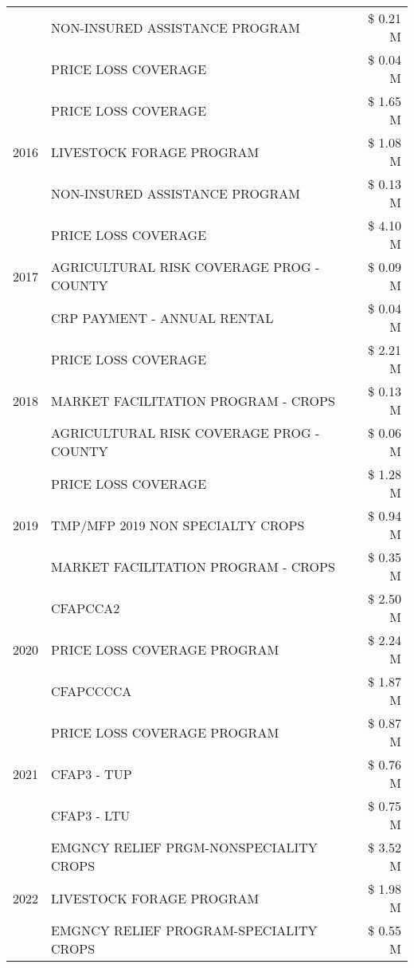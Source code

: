 \begin{tabular}{llr}
 & NON-INSURED ASSISTANCE PROGRAM & \$ 0.21 M \\
 & PRICE LOSS COVERAGE & \$ 0.04 M \\
\cline{1-3}
\multirow[t]{3}{*}{2016} & PRICE LOSS COVERAGE & \$ 1.65 M \\
 & LIVESTOCK FORAGE PROGRAM & \$ 1.08 M \\
 & NON-INSURED ASSISTANCE PROGRAM & \$ 0.13 M \\
\cline{1-3}
\multirow[t]{3}{*}{2017} & PRICE LOSS COVERAGE & \$ 4.10 M \\
 & AGRICULTURAL RISK COVERAGE PROG - COUNTY & \$ 0.09 M \\
 & CRP PAYMENT - ANNUAL RENTAL & \$ 0.04 M \\
\cline{1-3}
\multirow[t]{3}{*}{2018} & PRICE LOSS COVERAGE & \$ 2.21 M \\
 & MARKET FACILITATION PROGRAM - CROPS & \$ 0.13 M \\
 & AGRICULTURAL RISK COVERAGE PROG - COUNTY & \$ 0.06 M \\
\cline{1-3}
\multirow[t]{3}{*}{2019} & PRICE LOSS COVERAGE & \$ 1.28 M \\
 & TMP/MFP 2019 NON SPECIALTY CROPS & \$ 0.94 M \\
 & MARKET FACILITATION PROGRAM - CROPS & \$ 0.35 M \\
\cline{1-3}
\multirow[t]{3}{*}{2020} & CFAPCCA2 & \$ 2.50 M \\
 & PRICE LOSS COVERAGE PROGRAM & \$ 2.24 M \\
 & CFAPCCCCA & \$ 1.87 M \\
\cline{1-3}
\multirow[t]{3}{*}{2021} & PRICE LOSS COVERAGE PROGRAM & \$ 0.87 M \\
 & CFAP3 - TUP & \$ 0.76 M \\
 & CFAP3 - LTU & \$ 0.75 M \\
\cline{1-3}
\multirow[t]{3}{*}{2022} & EMGNCY RELIEF PRGM-NONSPECIALITY CROPS & \$ 3.52 M \\
 & LIVESTOCK FORAGE PROGRAM & \$ 1.98 M \\
 & EMGNCY RELIEF PROGRAM-SPECIALITY CROPS & \$ 0.55 M \\
\cline{1-3}
\bottomrule
\end{tabular}
